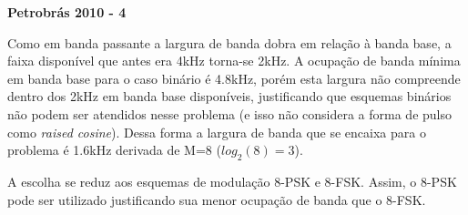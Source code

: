 \textbf{Petrobrás 2010 - 4}

Como em banda passante a largura de banda dobra em relação à banda base, a faixa disponível que antes era 4kHz torna-se 2kHz. A ocupação de banda mínima em banda base para o caso binário é 4.8kHz, porém esta largura não compreende dentro dos 2kHz em banda base disponíveis, justificando que esquemas binários não podem ser atendidos nesse problema (e isso não considera a forma de pulso como \textit{raised cosine}). Dessa forma a largura de banda que se encaixa para o problema é 1.6kHz derivada de M=8 ($log_2(8)=3$). 

A escolha se reduz aos esquemas de modulação 8-PSK e 8-FSK. Assim, o 8-PSK pode ser utilizado justificando sua menor ocupação de banda que o 8-FSK.